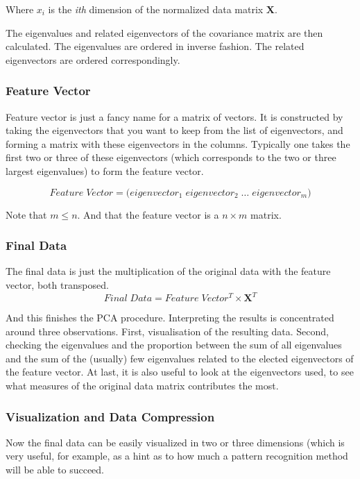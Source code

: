 \documentclass[12pt]{article}
\begin{document}
Where $x_i$ is the \emph{ith} dimension of the normalized data matrix
$\mathbf{X}$.

The eigenvalues and related eigenvectors of the covariance matrix are then
calculated. The eigenvalues are ordered in inverse fashion. The related
eigenvectors are ordered correspondingly.

\subsubsection{Feature Vector}
Feature vector is just a fancy name for a matrix of vectors.
It is constructed by taking the eigenvectors that you want to keep
from the list of eigenvectors, and forming a matrix with these
eigenvectors in the columns. Typically one takes the first two or
three of these eigenvectors (which corresponds to the two or three
largest eigenvalues) to form the feature vector.

\begin{equation}
 Feature \; Vector=\bigg(eigenvector_1 \; eigenvector_2 \; \dots \; eigenvector_m \bigg)
\end{equation}

Note that $m \leq n$. And that the feature vector is a $n \times m$ matrix.

\subsubsection{Final Data}
The final data is just the multiplication of the original data with the feature vector, both
transposed.
\begin{equation}
 Final \; Data=Feature \; Vector^T \times \mathbf{X}^T
\end{equation}

And this finishes the PCA procedure. Interpreting the results is concentrated around
three observations. First, visualisation of the resulting data. Second, checking the
eigenvalues and the proportion between the sum of all eigenvalues and the sum of the
(usually) few eigenvalues related to the elected eigenvectors of the feature vector. At last,
it is also useful to look at the eigenvectors used, to see what measures of the original
data matrix contributes the most.


\subsubsection{Visualization and Data Compression}
Now the final data can be easily visualized in two or three dimensions (which
is very useful, for example, as a hint as to how much a pattern recognition
method will be able to succeed.
\end{document}
